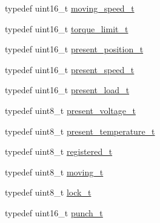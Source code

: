 \begin{DoxyCompactItemize}
\item 
typedef uint16\+\_\+t \hyperlink{structdynamixel_1_1servos_1_1_model_traits_3_01_ax12_01_4_1_1_c_t_a24884b1ed34e8cea2479b3d3b70cc278}{moving\+\_\+speed\+\_\+t}
\item 
typedef uint16\+\_\+t \hyperlink{structdynamixel_1_1servos_1_1_model_traits_3_01_ax12_01_4_1_1_c_t_acf60519762b645c78f05eb7cd19b943e}{torque\+\_\+limit\+\_\+t}
\item 
typedef uint16\+\_\+t \hyperlink{structdynamixel_1_1servos_1_1_model_traits_3_01_ax12_01_4_1_1_c_t_a5c4a35e58c836ce0534ef32fcaf4b391}{present\+\_\+position\+\_\+t}
\item 
typedef uint16\+\_\+t \hyperlink{structdynamixel_1_1servos_1_1_model_traits_3_01_ax12_01_4_1_1_c_t_ac14ddc74cc1462aae48c827e19e21081}{present\+\_\+speed\+\_\+t}
\item 
typedef uint16\+\_\+t \hyperlink{structdynamixel_1_1servos_1_1_model_traits_3_01_ax12_01_4_1_1_c_t_a4559bc7f6aa979f78479ff7345fb2e26}{present\+\_\+load\+\_\+t}
\item 
typedef uint8\+\_\+t \hyperlink{structdynamixel_1_1servos_1_1_model_traits_3_01_ax12_01_4_1_1_c_t_a86ed76f5847382a6f9294b1dce71357e}{present\+\_\+voltage\+\_\+t}
\item 
typedef uint8\+\_\+t \hyperlink{structdynamixel_1_1servos_1_1_model_traits_3_01_ax12_01_4_1_1_c_t_a1014b5b83a6ec05538b80d87907c0c5b}{present\+\_\+temperature\+\_\+t}
\item 
typedef uint8\+\_\+t \hyperlink{structdynamixel_1_1servos_1_1_model_traits_3_01_ax12_01_4_1_1_c_t_a3929ddffb6d53a5b3cf89d0fc516bd53}{registered\+\_\+t}
\item 
typedef uint8\+\_\+t \hyperlink{structdynamixel_1_1servos_1_1_model_traits_3_01_ax12_01_4_1_1_c_t_abead5fe9d36a2381313b42aacc5d28f2}{moving\+\_\+t}
\item 
typedef uint8\+\_\+t \hyperlink{structdynamixel_1_1servos_1_1_model_traits_3_01_ax12_01_4_1_1_c_t_ad7457ad61b93faee650df398279079bd}{lock\+\_\+t}
\item 
typedef uint16\+\_\+t \hyperlink{structdynamixel_1_1servos_1_1_model_traits_3_01_ax12_01_4_1_1_c_t_ac92a6c5b696ec40ee9c28b1a61cc10d1}{punch\+\_\+t}
\end{DoxyCompactItemize}
